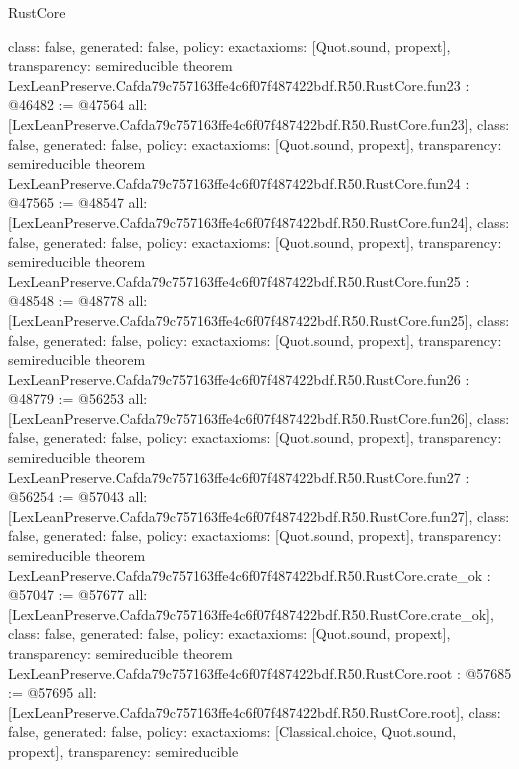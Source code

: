 \begin{lexlean}{RustCore}
\begin{coremodule}
{  class: false,
  generated: false,
  policy: exact{axioms: [Quot.sound, propext]},
  transparency: semireducible
}
theorem LexLeanPreserve.Cafda79c757163ffe4c6f07f487422bdf.R50.RustCore.fun23 : @46482 := @47564 {
  all: [LexLeanPreserve.Cafda79c757163ffe4c6f07f487422bdf.R50.RustCore.fun23],
  class: false,
  generated: false,
  policy: exact{axioms: [Quot.sound, propext]},
  transparency: semireducible
}
theorem LexLeanPreserve.Cafda79c757163ffe4c6f07f487422bdf.R50.RustCore.fun24 : @47565 := @48547 {
  all: [LexLeanPreserve.Cafda79c757163ffe4c6f07f487422bdf.R50.RustCore.fun24],
  class: false,
  generated: false,
  policy: exact{axioms: [Quot.sound, propext]},
  transparency: semireducible
}
theorem LexLeanPreserve.Cafda79c757163ffe4c6f07f487422bdf.R50.RustCore.fun25 : @48548 := @48778 {
  all: [LexLeanPreserve.Cafda79c757163ffe4c6f07f487422bdf.R50.RustCore.fun25],
  class: false,
  generated: false,
  policy: exact{axioms: [Quot.sound, propext]},
  transparency: semireducible
}
theorem LexLeanPreserve.Cafda79c757163ffe4c6f07f487422bdf.R50.RustCore.fun26 : @48779 := @56253 {
  all: [LexLeanPreserve.Cafda79c757163ffe4c6f07f487422bdf.R50.RustCore.fun26],
  class: false,
  generated: false,
  policy: exact{axioms: [Quot.sound, propext]},
  transparency: semireducible
}
theorem LexLeanPreserve.Cafda79c757163ffe4c6f07f487422bdf.R50.RustCore.fun27 : @56254 := @57043 {
  all: [LexLeanPreserve.Cafda79c757163ffe4c6f07f487422bdf.R50.RustCore.fun27],
  class: false,
  generated: false,
  policy: exact{axioms: [Quot.sound, propext]},
  transparency: semireducible
}
theorem LexLeanPreserve.Cafda79c757163ffe4c6f07f487422bdf.R50.RustCore.crate_ok : @57047 := @57677 {
  all: [LexLeanPreserve.Cafda79c757163ffe4c6f07f487422bdf.R50.RustCore.crate_ok],
  class: false,
  generated: false,
  policy: exact{axioms: [Quot.sound, propext]},
  transparency: semireducible
}
theorem LexLeanPreserve.Cafda79c757163ffe4c6f07f487422bdf.R50.RustCore.root : @57685 := @57695 {
  all: [LexLeanPreserve.Cafda79c757163ffe4c6f07f487422bdf.R50.RustCore.root],
  class: false,
  generated: false,
  policy: exact{axioms: [Classical.choice, Quot.sound, propext]},
  transparency: semireducible
}


\end{coremodule}
\end{lexlean}
